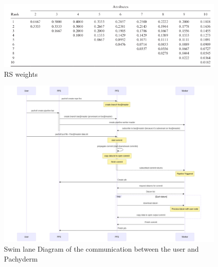 \begin{figure}[htb]
    \centering
    \includegraphics[width=16cm]{graphics/RS_weigts.png}
    \caption[RS weights]{RS weights \footnotemark}
    \label{abb:RS_weights}
  \end{figure}
  


\begin{figure}[htb]
  \centering
  \includegraphics[width=14cm]{graphics/pipeline_communication_sld.png}
  \caption[Swim lane Diagram of the communication between the user and Pachyderm]{Swim lane Diagram of the communication between the user and Pachyderm\footnotemark}
  \label{abb:pipeline_communication_sld}
\end{figure}

\newpage



\label{appendix:minikube_installation_instructions}


